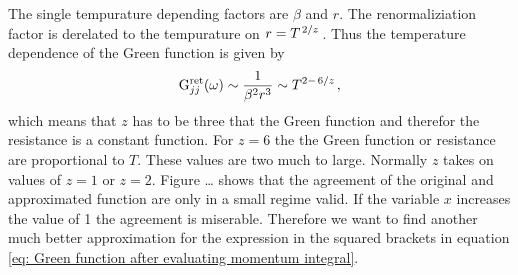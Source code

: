 %
The single tempurature depending factors are $\beta$ and $r$.
The renormaliziation factor is derelated to the tempurature on $r = T^{\left.2\middle\slash z\right.}$.
Thus the temperature dependence of the Green function is given by
%
\begin{align}
	\mathrm{G}_{jj}^{\mathrm{ret}}(\omega) \sim \frac{1}{\beta^{2} r^{3}} \sim T^{2-\left.6\middle\slash z\right.},
\end{align}
%
which means that $z$ has to be three that the Green function and therefor the resistance is a constant function.
For $z=6$ the the Green function or resistance are proportional to $T$.
These values are two much to large.
Normally $z$ takes on values of $z=1$ or $z=2$.
Figure \dots {} shows that the agreement of the original and approximated function are only in a small regime valid.
If the variable $x$ increases the value of 1 the agreement is miserable.
Therefore we want to find another much better approximation for the expression in the squared brackets in equation \eqref{eq: Green function after evaluating momentum integral}.

